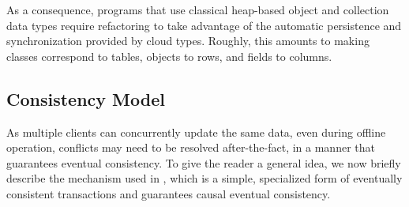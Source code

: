 \documentclass[article]{sigplanconf}
\begin{document}
As a consequence, programs that use
classical heap-based object and collection data types require refactoring to
take advantage of the automatic persistence and synchronization provided by
cloud types. Roughly, this amounts to making classes correspond to tables,
objects to rows, and fields to columns. 

\subsection{Consistency Model}
\label{sec:ConsistencyModel}

As multiple clients can concurrently update the same data, even during offline operation, conflicts may need to be resolved after-the-fact, in a manner that guarantees eventual consistency. To give the reader a general idea, we now briefly describe the mechanism used in \TD, which is a simple, specialized form of eventually consistent transactions \cite{burckhardt2012ect} and guarantees causal eventual consistency. 
\end{document}
